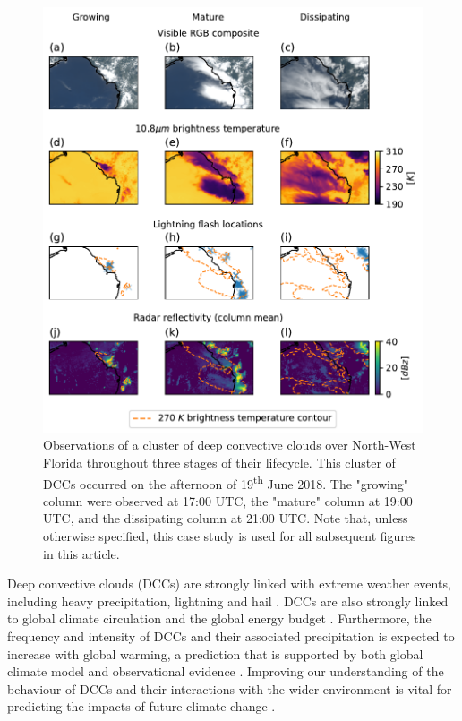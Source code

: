 \documentclass[amt, manuscript]{copernicus}
\begin{document}
\begin{figure}[t]
    \includegraphics[width=12cm]{figure01.pdf}
    \caption{Observations of a cluster of deep convective clouds over North-West Florida throughout three stages of their lifecycle. This cluster of DCCs occurred on the afternoon of 19\textsuperscript{th} June 2018. The "growing" column were observed at 17:00 UTC, the "mature" column at 19:00 UTC, and the dissipating column at 21:00 UTC. Note that, unless otherwise specified, this case study is used for all subsequent figures in this article.}
    \label{fig:compare_sat_radar_glm}
\end{figure}


Deep convective clouds (DCCs) are strongly linked with extreme weather events, including heavy precipitation, lightning and hail \citep{westra_future_2014, houze_chapter_2014, williams_radar_1992, bruning_theory_2013, punge_hail_2016, matsudo_severe_2011}. 
DCCs are also strongly linked to global climate circulation and the global energy budget \citep{houze_mesoscale_2004, fritsch_mesoscale_2001, johnson_mesoscale_2001}.
Furthermore, the frequency and intensity of DCCs and their associated precipitation is expected to increase with global warming, a prediction that is supported by both global climate model \citep{allen_constraints_2002, trenberth_changing_2003, held_robust_2006, muller_energetic_2011, ogorman_energetic_2012, ogorman_precipitation_2015} and observational evidence \citep{tan_increases_2015, berg_strong_2013, aumann_increased_2018, houze_extreme_2019}.
Improving our understanding of the behaviour of DCCs and their interactions with the wider environment is vital for predicting the impacts of future climate change \citep{westra_future_2014}.
\end{document}
